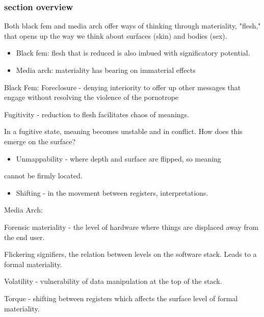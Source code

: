 \documentclass[11pt]{article}
\begin{document}
\subsubsection{section overview}
\label{sec:org2df7964}
Both black fem and media arch offer ways of thinking through
materiality, "flesh," that opens up the way we think about surfaces
(skin) and bodies (sex).
\begin{itemize}
\item Black fem: flesh that is reduced is also imbued with significatory
potential.
\item Media arch: materiality has bearing on immaterial effects
\end{itemize}

Black Fem: 
  Foreclosure - denying interiority to offer up other messages that
  engage without resolving the violence of the pornotrope

Fugitivity - reduction to flesh facilitates chaos of meanings.

In a fugitive state, meaning becomes unstable and in conflict. How
does this emerge on the surface?
\begin{itemize}
\item Unmappability - where depth and surface are flipped, so meaning
\end{itemize}
cannot be firmly located.
\begin{itemize}
\item Shifting - in the movement between registers, interpretations.
\end{itemize}

Media Arch:

Forensic materiality - the level of hardware where things are
displaced away from the end user.

Flickering signifiers, the relation between levels on the software
stack. Leads to a formal materiality. 

Volatility - vulnerability of data manipulation at the top of the
stack. 

Torque - shifting between registers which affects the surface level of
formal materiality. 
\end{document}
